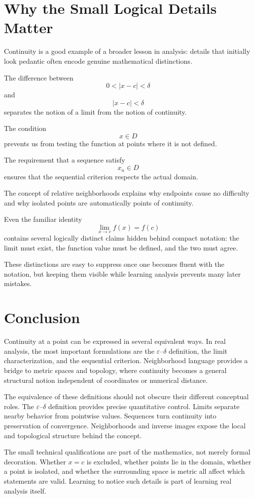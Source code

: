 \documentclass{essay}
\begin{document}
\section{Why the Small Logical Details Matter}

Continuity is a good example of a broader lesson in analysis: details that initially look pedantic often encode genuine mathematical distinctions.

The difference between
\[
0<|x-c|<\delta
\]
and
\[
|x-c|<\delta
\]
separates the notion of a limit from the notion of continuity.

The condition
\[
x\in D
\]
prevents us from testing the function at points where it is not defined.

The requirement that a sequence satisfy
\[
x_n\in D
\]
ensures that the sequential criterion respects the actual domain.

The concept of relative neighborhoods explains why endpoints cause no difficulty and why isolated points are automatically points of continuity.

Even the familiar identity
\[
\lim_{x\to c}f(x)=f(c)
\]
contains several logically distinct claims hidden behind compact notation: the limit must exist, the function value must be defined, and the two must agree.

These distinctions are easy to suppress once one becomes fluent with the notation, but keeping them visible while learning analysis prevents many later mistakes.

\section{Conclusion}

Continuity at a point can be expressed in several equivalent ways. In real analysis, the most important formulations are the $\varepsilon$--$\delta$ definition, the limit characterization, and the sequential criterion. Neighborhood language provides a bridge to metric spaces and topology, where continuity becomes a general structural notion independent of coordinates or numerical distance.

The equivalence of these definitions should not obscure their different conceptual roles. The $\varepsilon$--$\delta$ definition provides precise quantitative control. Limits separate nearby behavior from pointwise values. Sequences turn continuity into preservation of convergence. Neighborhoods and inverse images expose the local and topological structure behind the concept.

The small technical qualifications are part of the mathematics, not merely formal decoration. Whether $x=c$ is excluded, whether points lie in the domain, whether a point is isolated, and whether the surrounding space is metric all affect which statements are valid. Learning to notice such details is part of learning real analysis itself.
\end{document}
